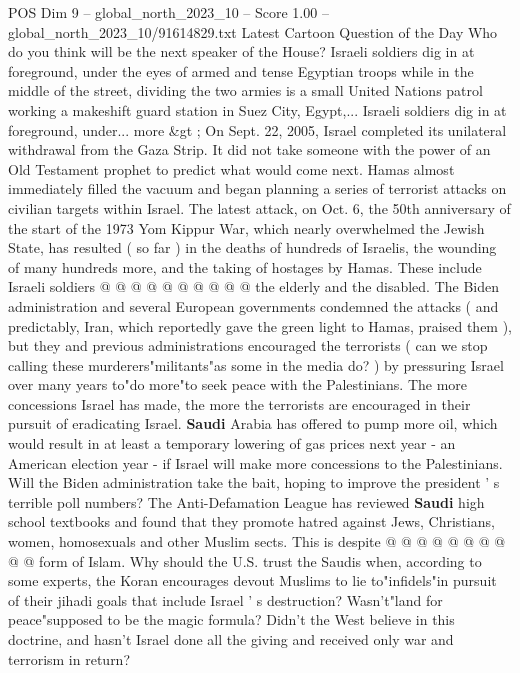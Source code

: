 \begin{textsample}{POS Dim 9 – global\_north\_2023\_10 – Score 1.00 – global\_north\_2023\_10/91614829.txt}  \label{ex:f9_pos_411}
Latest Cartoon Question of the Day Who do you think will be the next speaker of the House?
Israeli soldiers dig in at foreground, under the eyes of armed and tense Egyptian troops while in the middle of the street, dividing the two armies is a small United Nations patrol working a makeshift guard station in Suez City, Egypt,...
Israeli soldiers dig in at foreground, under... more \&gt ; On Sept. 22, 2005, Israel completed its unilateral withdrawal from the Gaza Strip.
It did not take someone with the power of an Old Testament prophet to predict what would come next.
Hamas almost immediately filled the vacuum and began planning a series of terrorist attacks on civilian targets within Israel.
The latest attack, on Oct. 6, the 50th anniversary of the start of the 1973 Yom Kippur War, which nearly overwhelmed the Jewish State, has resulted ( so far ) in the deaths of hundreds of Israelis, the wounding of many hundreds more, and the taking of hostages by Hamas.
These include Israeli soldiers @ @ @ @ @ @ @ @ @ @ the elderly and the disabled.
The Biden administration and several European governments condemned the attacks ( and predictably, Iran, which reportedly gave the green light to Hamas, praised them ), but they and previous administrations encouraged the terrorists ( can we stop calling these murderers"militants"as some in the media do? ) by pressuring Israel over many years to"do more"to seek peace with the Palestinians.
The more concessions Israel has made, the more the terrorists are encouraged in their pursuit of eradicating Israel. \textbf{Saudi} Arabia has offered to pump more oil, which would result in at least a temporary lowering of gas prices next year - an American election year - if Israel will make more concessions to the Palestinians.
Will the Biden administration take the bait, hoping to improve the president ' s terrible poll numbers?
The Anti-Defamation League has reviewed \textbf{Saudi} high school textbooks and found that they promote hatred against Jews, Christians, women, homosexuals and other Muslim sects.
This is despite @ @ @ @ @ @ @ @ @ @ form of Islam.
Why should the U.S. trust the Saudis when, according to some experts, the Koran encourages devout Muslims to lie to"infidels"in pursuit of their jihadi goals that include Israel ' s destruction?
Wasn't"land for peace"supposed to be the magic formula?
Didn't the West believe in this doctrine, and hasn't Israel done all the giving and received only war and terrorism in return?

\end{textsample}
